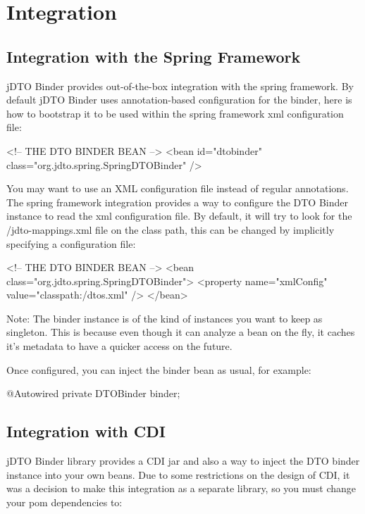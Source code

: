 \documentclass[11pt]{article}
\newcommand{\JDTO}{jDTO Binder\xspace}
\newcommand{\DEFAULTCONFIG}{/jdto-mappings.xml\xspace}
\begin{document}
\section{Integration}

\subsection{Integration with the Spring Framework}

\JDTO provides out-of-the-box integration with the spring framework. By default \JDTO uses annotation-based configuration for the binder, here is how to bootstrap it to be used within the spring framework xml configuration file:


\begin{xml}
<!-- THE DTO BINDER BEAN --> 
<bean id="dtobinder" 
    class="org.jdto.spring.SpringDTOBinder" />
\end{xml}


You may want to use an XML configuration file instead of regular annotations. The spring framework integration
provides a way to configure the DTO Binder instance to read the xml configuration file. By default, it will try to look for the \DEFAULTCONFIG file on the class path, this can be changed by implicitly specifying a configuration file:


\begin{xml}
<!-- THE DTO BINDER BEAN --> 
<bean class="org.jdto.spring.SpringDTOBinder">
    <property name="xmlConfig" value="classpath:/dtos.xml" />
</bean>
\end{xml}


Note: The binder instance is of the kind of instances you want to keep as singleton. This is because even though it can analyze a bean on the fly, it caches it's metadata to have a quicker access on the future.

Once configured, you can inject the binder bean as usual, for example:


\begin{java}
@Autowired
private DTOBinder binder;
\end{java}

\subsection{Integration with CDI}

\JDTO library provides a CDI jar and also a way to inject the DTO binder instance into your own beans. Due to some restrictions on the design of CDI, it was a decision to make this integration as a separate library, so you must change your pom dependencies to:
\end{document}

